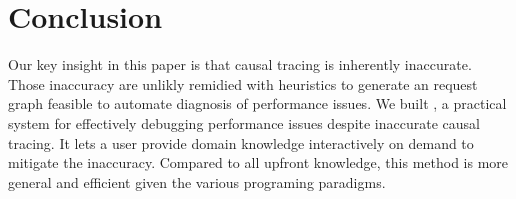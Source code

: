 \section{Conclusion} \label{sec:conclusion}

Our key insight in this paper is that causal tracing is inherently inaccurate.
Those inaccuracy are unlikly remidied with heuristics to generate an request
graph feasible to automate diagnosis of performance issues. We built \xxx, a
practical system for effectively debugging performance issues despite inaccurate
causal tracing. It lets a user provide domain knowledge interactively on demand
to mitigate the inaccuracy. Compared to all upfront knowledge, this method is
more general and efficient given the various programing paradigms.

\clearpage
